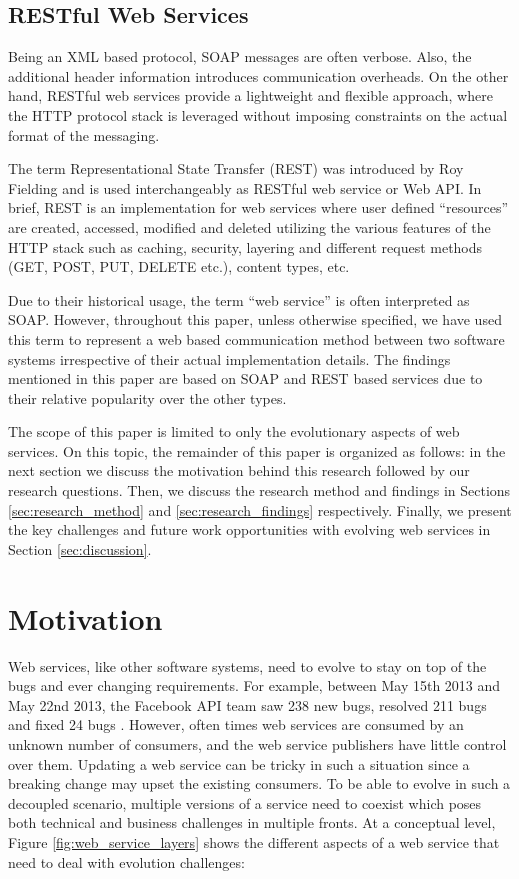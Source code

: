 \documentclass[runningheads,a4paper]{llncs}
\begin{document}

\subsection{RESTful Web Services} %
\label{sub:restful_web_services}
Being an XML based protocol, SOAP messages are often verbose. Also, the additional header information introduces communication overheads. On the other hand, RESTful web services provide a lightweight and flexible approach, where the HTTP protocol stack is leveraged without imposing constraints on the actual format of the messaging.

The term Representational State Transfer (REST) was introduced by Roy Fielding \cite{rest_wiki} and is used interchangeably as RESTful web service or Web API. In brief, REST is an implementation for web services where user defined ``resources'' are created, accessed, modified and deleted utilizing the various features of the HTTP stack such as caching, security, layering and different request methods (GET, POST, PUT, DELETE etc.), content types, etc.

Due to their historical usage, the term ``web service'' is often interpreted as SOAP. However, throughout this paper, unless otherwise specified, we have used this term to represent a web based communication method between two software systems irrespective of their actual implementation details. The findings mentioned in this paper are based on SOAP and REST based services due to their relative popularity over the other types.

The scope of this paper is limited to only the evolutionary aspects of web services. On this topic, the remainder of this paper is organized as follows: in the next section we discuss the motivation behind this research followed by our research questions. Then, we discuss the research method and findings in Sections \ref{sec:research_method} and \ref{sec:research_findings} respectively. Finally, we present the key challenges and future work opportunities with evolving web services in Section \ref{sec:discussion}.

\section{Motivation} %
\label{sec:motivation}
Web services, like other software systems, need to evolve to stay on top of the bugs and ever changing requirements. For example, between May 15th 2013 and May 22nd 2013, the Facebook API team saw 238 new bugs, resolved 211 bugs and fixed 24 bugs \cite{facebook_release_note}. However, often times web services are consumed by an unknown number of consumers, and the web service publishers have little control over them. Updating a web service can be tricky in such a situation since a breaking change may upset the existing consumers. To be able to evolve in such a decoupled scenario, multiple versions of a service need to coexist which poses both technical and business challenges in multiple fronts. At a conceptual level, Figure \ref{fig:web_service_layers} shows the different aspects of a web service that need to deal with evolution challenges:
\end{document}
